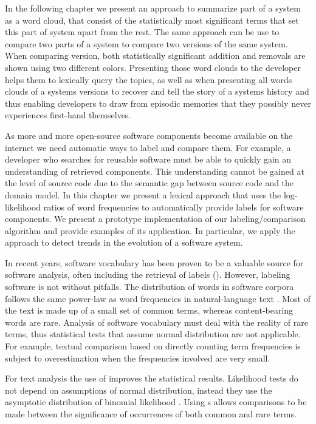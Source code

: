 In the following chapter we present an approach to summarize part of a system as a word cloud, that consist of the statistically most significant terms that set this part of system apart from the rest. The same approach can be use to compare two parts of a system to compare two versions of the same system. When comparing version, both statistically significant addition and removals are shown using two different colors. Presenting those word clouds to the developer helps them to lexically query the topics, as well as when presenting all words clouds of a systems versions to recover and tell the story of a systems history and thus enabling developers to draw from episodic memories that they possibly never experiences first-hand themselves.

\asteriskasteriskasterisk


As more and more open-source software components become available on the internet we need automatic ways to label and compare them. For example, a developer who searches for reusable software must be able to quickly gain an understanding of retrieved components. This understanding cannot be gained at the level of source code due to the semantic gap between source code and the domain model. In this chapter we present a lexical approach that uses the log-likelihood ratios of word frequencies to automatically provide labels for software components. We present a prototype implementation of our labeling/comparison algorithm and provide examples of its application. In particular, we apply the approach to detect trends in the evolution of a software system.

In recent years, software vocabulary has been proven to be a valuable source for software analysis, often including the retrieval of labels (\eg \cite{Baldi08OOPSLA,EinarHoest,Kuhn07a}). However, labeling software is not without pitfalls. The distribution of words in software corpora follows the same power-law as word frequencies in natural-language text \cite{Linstead09SUITE}. Most of the text is made up of a small set of common terms, whereas content-bearing words are rare. Analysis of software vocabulary must deal with the reality of rare terms, thus statistical tests that assume normal distribution are not applicable. For example, textual comparison based on directly counting term frequencies is subject to overestimation when the frequencies involved are very small.  

For text analysis the use of \loglr improves the statistical results. Likelihood tests do not depend on assumptions of normal distribution, instead they use the asymptotic distribution of binomial likelihood \cite{Dunning}. Using \loglr{}s allows comparisons to be made between the significance of occurrences of both common and rare terms.


